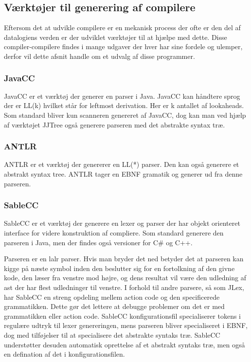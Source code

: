 \subsection{Værktøjer til generering af compilere}
\label{ssec:toolsforcc}

Eftersom det at udvikle compilere er en mekanisk process der ofte er den del af datalogiens verden er der udviklet værktøjer til at hjælpe med dette. Disse compiler-compilere findes i mange udgaver der hver har sine fordele og ulemper, derfor vil dette afsnit handle om et udvalg af disse programmer.

\subsubsection{JavaCC}
JavaCC er et værktøj der generer en parser i Java. JavaCC kan håndtere sprog der er LL(k) hvilket står for leftmost derivation. Her er k antallet af lookaheads. Som standard bliver kun scanneren genereret af JavaCC, dog kan man ved hjælp af værktøjet JJTree også generere parseren med det abstrakte syntax træ.

\subsubsection{ANTLR}
ANTLR er et værktøj der genererer en LL(*) parser. Den kan også generere et abstrakt syntax tree. ANTLR tager en EBNF gramatik og generer ud fra denne parseren.

\subsubsection{SableCC}
SableCC er et værktøj der generere en lexer og parser der har objekt orienteret interface for videre konstruktion af compliere. Som standard generere den parseren i Java, men der findes også versioner for C\# og C++.
    
    
\noindent Parseren er en \gls{lalr} parser. Hvis man bryder det ned betyder det at parseren kan kigge på næste symbol inden den beslutter sig for en fortolkning af den givne kode, den læser fra venstre mod højre, og dens resultat vil være den udledning af \gls{ast} der har flest udledninger til venstre.
\noindent I forhold til andre parsere, så som JLex, har SableCC en streng opdeling mellem action code og den specificerede grammatikken. Dette gør det lettere at debugge problemer om det er med grammatikken eller action code.
\noindent SableCC konfigurationsfil specialiserer tokens i regulære udtryk til lexer genereringen, mens parseren bliver specialiseret i EBNF, dog med tilføjelser til at specialisere det abstrakte syntaks træ.
\noindent SableCC understøtter desuden automatisk oprettelse af et abstrakt syntaks træ, men også en defination af det i konfigurationsfilen.
